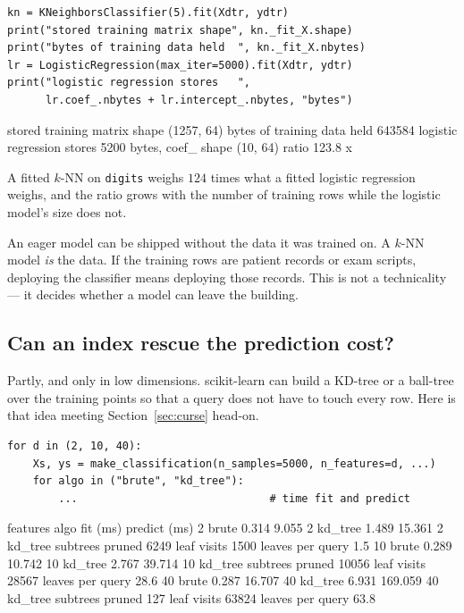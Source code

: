 \documentclass[11pt]{article}
\begin{document}
\begin{lstlisting}
kn = KNeighborsClassifier(5).fit(Xdtr, ydtr)
print("stored training matrix shape", kn._fit_X.shape)
print("bytes of training data held  ", kn._fit_X.nbytes)
lr = LogisticRegression(max_iter=5000).fit(Xdtr, ydtr)
print("logistic regression stores   ",
      lr.coef_.nbytes + lr.intercept_.nbytes, "bytes")
\end{lstlisting}
\begin{codeout}
stored training matrix shape (1257, 64)
bytes of training data held   643584
logistic regression stores    5200 bytes, coef_ shape (10, 64)
ratio 123.8 x
\end{codeout}

A fitted $k$-NN on \texttt{digits} weighs $124$ times what a fitted logistic
regression weighs, and the ratio grows with the number of training rows while
the logistic model's size does not.

\begin{caution}
An eager model can be shipped without the data it was trained on. A $k$-NN
model \emph{is} the data. If the training rows are patient records or exam
scripts, deploying the classifier means deploying those records. This is not a
technicality --- it decides whether a model can leave the building.
\end{caution}

\subsection{Can an index rescue the prediction cost?}

Partly, and only in low dimensions. scikit-learn can build a KD-tree or a
ball-tree over the training points so that a query does not have to touch every
row. Here is that idea meeting Section~\ref{sec:curse} head-on.

\begin{lstlisting}
for d in (2, 10, 40):
    Xs, ys = make_classification(n_samples=5000, n_features=d, ...)
    for algo in ("brute", "kd_tree"):
        ...                              # time fit and predict
\end{lstlisting}
\begin{codeout}
features        algo     fit (ms)   predict (ms)
2              brute        0.314          9.055
2            kd_tree        1.489         15.361
2            kd_tree  subtrees pruned    6249   leaf visits    1500   leaves per query    1.5
10             brute        0.289         10.742
10           kd_tree        2.767         39.714
10           kd_tree  subtrees pruned   10056   leaf visits   28567   leaves per query   28.6
40             brute        0.287         16.707
40           kd_tree        6.931        169.059
40           kd_tree  subtrees pruned     127   leaf visits   63824   leaves per query   63.8
\end{codeout}
\end{document}
